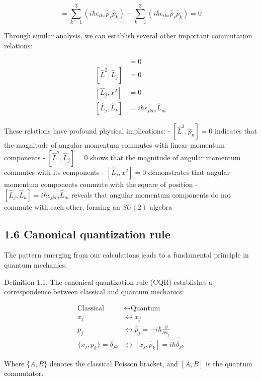 \documentclass[italian]{HKNdocument}
\begin{document}
\begin{equation*}
[\hat{L}_i, \hat{p}^2] = \sum_{k=1}^{3}(i\hbar\epsilon_{iks}\hat{p}_s\hat{p}_k) - \sum_{k=1}^{3}(i\hbar\epsilon_{iks}\hat{p}_s\hat{p}_k) = 0 \tag{1.73}
\end{equation*}

Through similar analysis, we can establish several other important commutation relations:

\begin{align*}
[\hat{L}^2, \hat{p}_n] &= 0 \\
[\hat{L}^2, \hat{L}_j] &= 0 \\
[\hat{L}_j, x^2] &= 0 \tag{1.74} \\
[\hat{L}_j, \hat{L}_k] &= i\hbar\epsilon_{jkm}\hat{L}_m
\end{align*}

These relations have profound physical implications:
- $[\hat{L}^2, \hat{p}_n] = 0$ indicates that the magnitude of angular momentum commutes with linear momentum components
- $[\hat{L}^2, \hat{L}_j] = 0$ shows that the magnitude of angular momentum commutes with its components
- $[\hat{L}_j, x^2] = 0$ demonstrates that angular momentum components commute with the square of position
- $[\hat{L}_j, \hat{L}_k] = i\hbar\epsilon_{jkm}\hat{L}_m$ reveals that angular momentum components do not commute with each other, forming an $SU(2)$ algebra

\subsection*{1.6 Canonical quantization rule}

The pattern emerging from our calculations leads to a fundamental principle in quantum mechanics:

Definition 1.1. The canonical quantization rule (CQR) establishes a correspondence between classical and quantum mechanics:

\begin{align*}
\text{Classical} &\longleftrightarrow \text{Quantum} \\
x_j &\longleftrightarrow x_j \\
p_j &\longleftrightarrow \hat{p}_j = -i\hbar\frac{\partial}{\partial x_j} \tag{1.75} \\
\{x_j, p_k\} = \delta_{jk} &\longleftrightarrow [x_j, \hat{p}_k] = i\hbar\delta_{jk}
\end{align*}

Where $\{A,B\}$ denotes the classical Poisson bracket, and $[A,B]$ is the quantum commutator.
\end{document}
